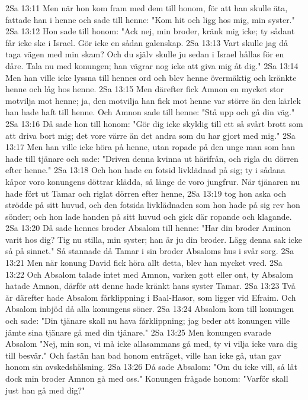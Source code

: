 2Sa 13:11  Men när hon kom fram med dem till honom, för att han skulle äta, fattade han i henne och sade till henne: "Kom hit och ligg hos mig, min syster."
2Sa 13:12  Hon sade till honom: "Ack nej, min broder, kränk mig icke; ty sådant får icke ske i Israel. Gör icke en sådan galenskap.
2Sa 13:13  Vart skulle jag då taga vägen med min skam? Och du själv skulle ju sedan i Israel hållas för en dåre. Tala nu med konungen; han vägrar nog icke att giva mig åt dig."
2Sa 13:14  Men han ville icke lyssna till hennes ord och blev henne övermäktig och kränkte henne och låg hos henne.
2Sa 13:15  Men därefter fick Amnon en mycket stor motvilja mot henne; ja, den motvilja han fick mot henne var större än den kärlek han hade haft till henne. Och Amnon sade till henne: "Stå upp och gå din väg."
2Sa 13:16  Då sade hon till honom: "Gör dig icke skyldig till ett så svårt brott som att driva bort mig; det vore värre än det andra som du har gjort med mig."
2Sa 13:17  Men han ville icke höra på henne, utan ropade på den unge man som han hade till tjänare och sade: "Driven denna kvinna ut härifrån, och rigla du dörren efter henne."
2Sa 13:18  Och hon hade en fotsid livklädnad på sig; ty i sådana kåpor voro konungens döttrar klädda, så länge de voro jungfrur. När tjänaren nu hade fört ut Tamar och riglat dörren efter henne,
2Sa 13:19  tog hon aska och strödde på sitt huvud, och den fotsida livklädnaden som hon hade på sig rev hon sönder; och hon lade handen på sitt huvud och gick där ropande och klagande.
2Sa 13:20  Då sade hennes broder Absalom till henne: "Har din broder Aminon varit hos dig? Tig nu stilla, min syster; han är ju din broder. Lägg denna sak icke så på sinnet." Så stannade då Tamar i sin broder Absaloms hus i svår sorg.
2Sa 13:21  Men när konung David fick höra allt detta, blev han mycket vred.
2Sa 13:22  Och Absalom talade intet med Amnon, varken gott eller ont, ty Absalom hatade Amnon, därför att denne hade kränkt hans syster Tamar.
2Sa 13:23  Två år därefter hade Absalom fårklippning i Baal-Hasor, som ligger vid Efraim. Och Absalom inbjöd då alla konungens söner.
2Sa 13:24  Absalom kom till konungen och sade: "Din tjänare skall nu hava fårklippning; jag beder att konungen ville jämte sina tjänare gå med din tjänare."
2Sa 13:25  Men konungen svarade Absalom "Nej, min son, vi må icke allasammans gå med, ty vi vilja icke vara dig till besvär." Och fastän han bad honom enträget, ville han icke gå, utan gav honom sin avskedshälsning.
2Sa 13:26  Då sade Absalom: "Om du icke vill, så låt dock min broder Amnon gå med oss." Konungen frågade honom: "Varför skall just han gå med dig?"
